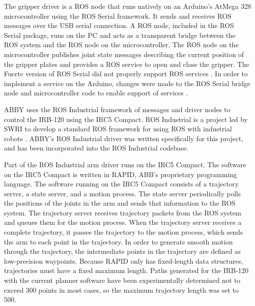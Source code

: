 \documentclass[]{cwru} %
\begin{document}
The gripper driver is a ROS node that runs natively on an Arduino's
AtMega 328 microcontroller using the ROS Serial framework. It sends and
receives ROS messages over the USB serial connection. A ROS node,
included in the ROS Serial package, runs on the PC and acts as a
transparent bridge between the ROS system and the ROS node on the
microcontroller. The ROS node on the microcontroller publishes joint
state messages describing the current position of the gripper plates and
provides a ROS service to open and close the gripper. The Fuerte version
of ROS Serial did not properly support ROS services \cite{venator_rosserial_ros_answers}. In order to
implement a service on the Arduino, changes were made to the ROS Serial
bridge node and microcontroller code to enable support of
services \cite{venator_rosserial_github}.

ABBY uses the ROS Industrial framework of messages and driver nodes to
control the IRB-120 using the IRC5 Compact. ROS Industrial is a project
led by SWRI to develop a standard ROS framework for using ROS with
industrial robots \cite{edwards}. ABBY's ROS Industrial driver was written
specifically for this project, and has been incorporated into the ROS
Industrial codebase.

Part of the ROS Industrial arm driver runs on the IRC5 Compact. The
software on the IRC5 Compact is written in RAPID, ABB's proprietary
programming language. The software running on the IRC5 Compact consists
of a trajectory server, a state server, and a motion process. The state
server periodically polls the positions of the joints in the arm and
sends that information to the ROS system. The trajectory server receives
trajectory packets from the ROS system and queues them for the motion
process. When the trajectory server receives a complete trajectory, it
passes the trajectory to the motion process, which sends the arm to each
point in the trajectory. In order to generate smooth motion through the
trajectory, the intermediate points in the trajectory are defined as
low-precision waypoints. Because RAPID only has fixed-length data
structures, trajectories must have a fixed maximum length. Paths
generated for the IRB-120 with the current planner software have been
experimentally determined not to exceed 300 points in most cases, so the
maximum trajectory length was set to 500.
\end{document}
